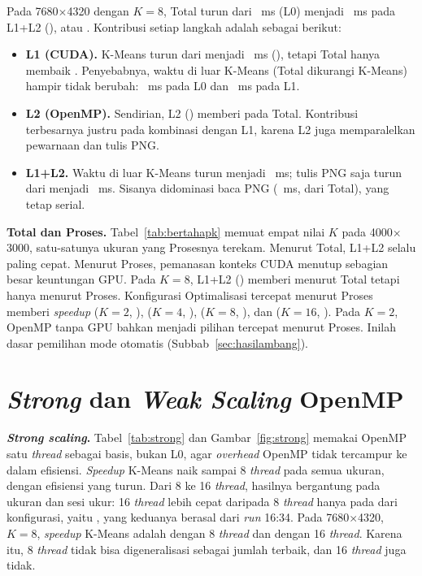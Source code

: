 Pada 7680$\times$4320 dengan $K=8$, Total turun dari \LoTotalDelapan~ms (L0) menjadi \LdLdTotalDelapan~ms pada L1+L2 (\LdLdCfgDelapan), atau \LdLdSTotalDelapan. Kontribusi setiap langkah adalah sebagai berikut:
\begin{itemize}
    \item \textbf{L1 (CUDA).} K-Means turun dari \LoKMDelapan{} menjadi \LdKMDelapan~ms (\LdSKMDelapan), tetapi Total hanya membaik \LdSTotalDelapan. Penyebabnya, waktu di luar K-Means (Total dikurangi K-Means) hampir tidak berubah: \LuarLoDelapan~ms pada L0 dan \LuarLdDelapan~ms pada L1.
    \item \textbf{L2 (OpenMP).} Sendirian, L2 (\LdbCfgDelapan) memberi \LdbSTotalDelapan{} pada Total. Kontribusi terbesarnya justru pada kombinasi dengan L1, karena L2 juga memparalelkan pewarnaan dan tulis PNG.
    \item \textbf{L1+L2.} Waktu di luar K-Means turun menjadi \LuarLdLdDelapan~ms; tulis PNG saja turun dari \TulisLoDelapan{} menjadi \TulisLdLdDelapan~ms. Sisanya didominasi baca PNG (\BacaLdLdDelapan~ms, \PorsiBacaLdLdDelapan{} dari Total), yang tetap serial.
\end{itemize}



\textbf{Total dan Proses.} Tabel~\ref{tab:bertahapk} memuat empat nilai $K$ pada 4000$\times$3000, satu-satunya ukuran yang Prosesnya terekam. Menurut Total, L1+L2 selalu paling cepat. Menurut Proses, pemanasan konteks CUDA menutup sebagian besar keuntungan GPU. Pada $K=8$, L1+L2 (\LdLdCfgEmpat) memberi \LdLdSTotalEmpat{} menurut Total tetapi hanya \LdLdSProsesEmpat{} menurut Proses. Konfigurasi Optimalisasi tercepat menurut Proses memberi \emph{speedup} \SProsesTerbaikKDua{} ($K=2$, \CfgProsesTerbaikKDua), \SProsesTerbaikKEmpat{} ($K=4$, \CfgProsesTerbaikKEmpat), \SProsesTerbaikKDelapan{} ($K=8$, \CfgProsesTerbaikKDelapan), dan \SProsesTerbaikKEnambelas{} ($K=16$, \CfgProsesTerbaikKEnambelas). Pada $K=2$, OpenMP tanpa GPU bahkan menjadi pilihan tercepat menurut Proses. Inilah dasar pemilihan mode otomatis (Subbab~\ref{sec:hasilambang}).

\section{\emph{Strong} dan \emph{Weak Scaling} OpenMP}
\label{sec:scaling}
\textbf{\emph{Strong scaling}.} Tabel~\ref{tab:strong} dan Gambar~\ref{fig:strong} memakai OpenMP satu \emph{thread} sebagai basis, bukan L0, agar \emph{overhead} OpenMP tidak tercampur ke dalam efisiensi. \emph{Speedup} K-Means naik sampai 8 \emph{thread} pada semua ukuran, dengan efisiensi yang turun. Dari 8 ke 16 \emph{thread}, hasilnya bergantung pada ukuran dan sesi ukur: 16 \emph{thread} lebih cepat daripada 8 \emph{thread} hanya pada \JmlEnambelasMenang{} dari \JmlStrong{} konfigurasi, yaitu \DaftarEnambelasMenang, yang keduanya berasal dari \emph{run} 16:34. Pada 7680$\times$4320, $K=8$, \emph{speedup} K-Means adalah \StrongDelapanTd{} dengan 8 \emph{thread} dan \StrongDelapanTe{} dengan 16 \emph{thread}. Karena itu, 8 \emph{thread} tidak bisa digeneralisasi sebagai jumlah terbaik, dan 16 \emph{thread} juga tidak.

